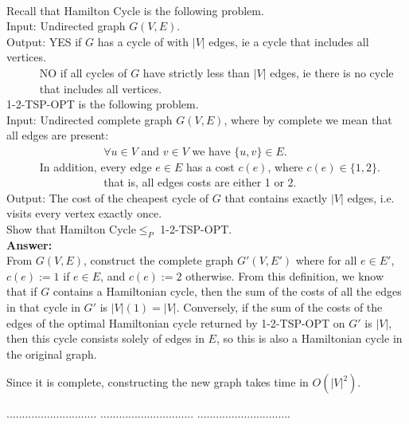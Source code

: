 \documentclass[a4paper,11pt]{article}
\begin{document}
\\
Recall that Hamilton Cycle is the following problem.\\
Input: Undirected graph $G(V,E)$.\\
Output: YES if $G$ has a cycle of with $|V|$ edges, ie a cycle that includes all vertices.\\
$~~~~~~~~~~~~$ NO if all cycles of $G$ have strictly less than $|V|$ edges, ie there is no cycle\\
$~~~~~~~~~~~~$ that includes all vertices.\\
1-2-TSP-OPT is the following problem. \\
Input: Undirected complete graph $G(V,E)$, where by complete we mean that all edges are present:\\
$~~~~~~~~~~~~~~~~~~~~~~~~~~~~~~~~~~~~~~$ $\forall u \in V$ and $v \in V$ we have $\{ u , v \} \in E$.\\
$~~~~~~~~~~~~$ In addition, every edge $e \in E$ has a cost $c(e)$, where $c(e) \in \{ 1 , 2 \}$.\\
$~~~~~~~~~~~~~~~~~~~~~~~~~~~~~~~~~~~~~~$ that is, all edges costs are either 1 or 2.\\
Output: The cost of the cheapest cycle of $G$ that contains exactly $|V|$ edges, i.e. visits every vertex exactly once. \\
Show that Hamilton Cycle$\leq_P$ 1-2-TSP-OPT. \\
{\bf Answer:}\\ 
From $G(V, E)$, construct the complete graph $G'(V, E')$ where for all $e \in E'$, $c(e) := 1$ if $e \in E$, and $c(e) := 2$ otherwise. From this definition, we know that if $G$ contains a Hamiltonian cycle, then the sum of the costs of all the edges in that cycle in $G'$ is $|V|(1) = |V|$. Conversely, if the sum of the costs of the edges of the optimal Hamiltonian cycle returned by 1-2-TSP-OPT on $G'$ is $|V|$, then this cycle consists solely of edges in $E$, so this is also a Hamiltonian cycle in the original graph. \par
Since it is complete, constructing the new graph takes time in $O(|V|^2)$.


\pagebreak

 $.............................$
 $..............................$
          $..............................$\\
\end{document}
